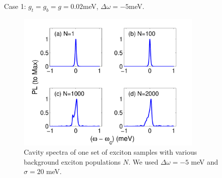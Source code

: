 \documentclass{beamer}
\begin{document}
\begin{frame}{Case 1: $ g_t=g_b=g=0.02 $meV, $ \Delta \omega=-5 $meV.}
\begin{figure}[htp]%
\centering
\begin{center}
\includegraphics[width=0.8\textwidth]{./Figs/spec_wdrand5s20_E0dot2_qd2000_stat200_sam1} %
\end{center}
\caption[Spectra samples for $N$ background excitons coupled cavity]{  Cavity spectra of one set of exciton samples with various background exciton populations $N$. We used $\Delta\omega=-5$ meV and $\sigma=20$ meV.}
\end{figure}

\end{frame}
\end{document}
